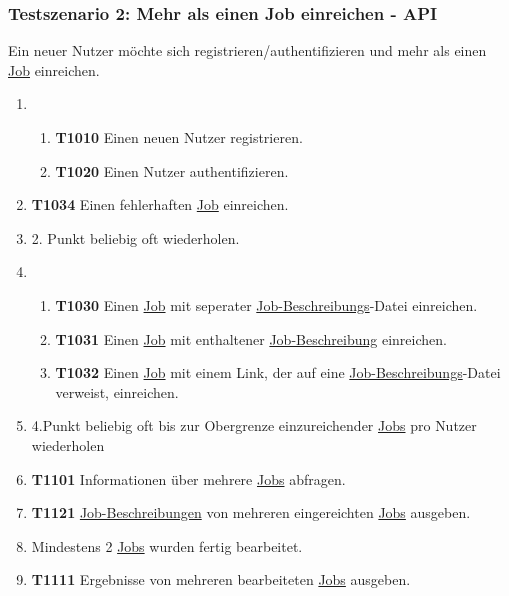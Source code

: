 \subsubsection{Testszenario 2: Mehr als einen Job einreichen - API}
Ein neuer \gls{Nutzer} möchte sich registrieren/authentifizieren und mehr als einen \hyperref[B:Jobs]{Job} einreichen.

\begin{enumerate}
    \item 
    \begin{enumerate}
        \item \textbf{T1010} Einen neuen \gls{Nutzer} registrieren.
        
        \item \textbf{T1020} Einen \gls{Nutzer} authentifizieren.
    \end{enumerate}
    
    \item \textbf{T1034} Einen fehlerhaften \hyperref[B:Jobs]{Job} einreichen.
    
    \item 2. Punkt beliebig oft wiederholen.
    
    \item 
    \begin{enumerate}
        \item \textbf{T1030} Einen \hyperref[B:Jobs]{Job} mit seperater \hyperref[B:Job-Beschreibung]{Job-Beschreibungs}-Datei einreichen. 
        
        \item \textbf{T1031} Einen \hyperref[B:Jobs]{Job} mit enthaltener \hyperref[B:Job-Beschreibung]{Job-Beschreibung} einreichen.
        
        \item \textbf{T1032} Einen \hyperref[B:Jobs]{Job} mit einem Link, der auf eine \hyperref[B:Job-Beschreibung]{Job-Beschreibungs}-Datei verweist, einreichen.
    \end{enumerate}
    
    \item 4.Punkt beliebig oft bis zur Obergrenze einzureichender \hyperref[B:Jobs]{Jobs} pro \gls{Nutzer} wiederholen
    
    \item \textbf{T1101} Informationen über mehrere \hyperref[B:Jobs]{Jobs} abfragen. 
    
    \item \textbf{T1121} \hyperref[B:Job-Beschreibung]{Job-Beschreibungen} von mehreren eingereichten \hyperref[B:Jobs]{Jobs} ausgeben.
    
    \item Mindestens 2 \hyperref[B:Jobs]{Jobs} wurden fertig bearbeitet.
    
    \item \textbf{T1111} Ergebnisse von mehreren bearbeiteten \hyperref[B:Jobs]{Jobs} ausgeben. 
\end{enumerate}

